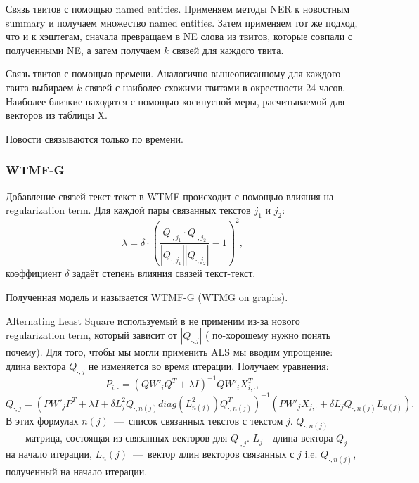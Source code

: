         Связь твитов с помощью named entities. Применяем методы NER к новостным summary и получаем множество named entities. Затем применяем тот же подход, что и к хэштегам, сначала превращаем в NE слова из твитов, которые совпали с полученными NE, а затем получаем $k$ связей для каждого твита.

        Связь твитов с помощью времени. Аналогично вышеописанному для каждого твита выбираем $k$ связей с наиболее схожими твитами в окрестности 24 часов. Наиболее близкие находятся с помощью косинусной меры, расчитываемой для векторов из таблицы X.

        Новости связываются только по времени.
    \subsubsection{WTMF-G}
        Добавление связей текст-текст в WTMF происходит с помощью влияния на regularization term. Для каждой пары связанных текстов $j_1$ и $j_2$:
        $$\lambda = \delta \cdot (\dfrac{Q_{\cdot,j_1}\cdot Q_{\cdot,j_2}}{|Q_{\cdot,j_1}|| Q_{\cdot,j_2}|}-1)^2,$$
        коэффициент $\delta$ задаёт степень влияния связей текст-текст.

        Полученная модель и называется WTMF-G (WTMG on graphs).

        Alternating Least Square используемый в \cite{steck_recommender} не применим из-за нового regularization term, который зависит от $|Q_{\cdot,j}|$ ({\color{red} по-хорошему нужно понять почему}). Для того, чтобы мы могли применить ALS мы вводим упрощение: длина вектора $Q_{\cdot,j}$ не изменяется во время итерации. Получаем уравнения:
        $$P_{i, \cdot} = (Q W'_i Q^T + \lambda I)^{-1} Q W'_i X_{i,\cdot}^T,$$
        $$Q_{\cdot, j} = (P W'_j P^T + \lambda I + \delta  L_j^2 Q_{\cdot,n(j)} diag(L^2_{n(j)})Q_{\cdot,n(j)}^T)^{-1}   (P W'_j X_{j,\cdot} + \delta  L_j Q_{\cdot,n(j)} L_{n(j)}).$$
        В этих формулах $n(j)$~---~список связанных текстов с текстом $j$. $Q_{\cdot,n(j)}$~---~матрица, состоящая из связанных векторов для $Q_{\cdot, j}$. $L_j$ - длина вектора $Q_j$ на начало итерации, $L_n(j)$~---~вектор длин векторов связанных с $j$ i.e. $Q_{\cdot,n(j)}$, полученный на начало итерации.
